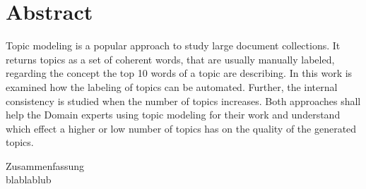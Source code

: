 %
\chapter*{Abstract}
\label{sec:abstract}
\vspace*{-10mm}

Topic modeling is a popular approach to study large document collections. It returns topics as a set of coherent words, that are usually manually labeled, regarding the concept the top 10 words of a topic are describing. In this work is examined how the labeling of topics can be automated. Further, the internal consistency  is studied when the number of topics increases. Both approaches shall help the Domain experts using topic modeling for their work and understand which effect a higher or low number of topics has on the quality of the generated topics. 

\vspace*{20mm}

{ Zusammenfassung}\label{sec:abstract-diff} \\

blablablub
\newpage